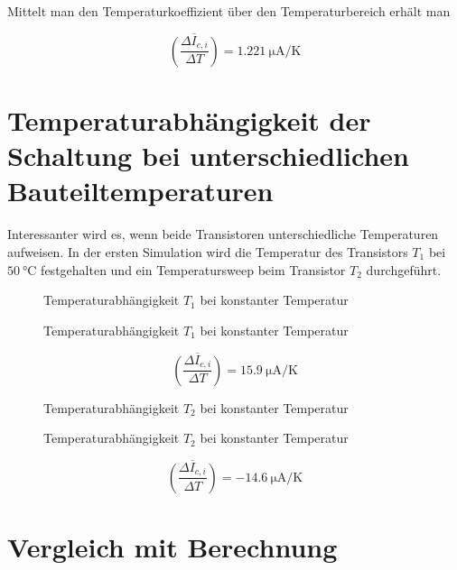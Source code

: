 Mittelt man den Temperaturkoeffizient über den Temperaturbereich erhält man

\begin{equation}
    \overline{\left({\frac{\Delta I_{c,i}}{\Delta T}}\right)} = \SI{1.221}{\micro\ampere\per\kelvin}
\end{equation}

\section{Temperaturabhängigkeit der Schaltung bei unterschiedlichen Bauteiltemperaturen}
Interessanter wird es, wenn beide Transistoren unterschiedliche Temperaturen aufweisen. In der ersten Simulation wird die Temperatur des Transistors $T_1$ bei $\SI{50}{\celsius}$ festgehalten und ein Temperatursweep beim Transistor $T_2$ durchgeführt.

\begin{figure}[H]
	\centering \small
	\scalebox{0.9}{}
	\caption{Temperaturabhängigkeit $T_1$ bei konstanter Temperatur}
	\label{fig_Kap4_08:diffT_1}
\end{figure}

\begin{figure}[H]
	\centering \small
	\scalebox{0.9}{}
	\caption{Temperaturabhängigkeit $T_1$ bei konstanter Temperatur}
	\label{fig_Kap4_09:diffT_2}
\end{figure}

\begin{equation}
    \overline{\left({\frac{\Delta I_{c,i}}{\Delta T}}\right)} = \SI{15.9}{\micro\ampere\per\kelvin}
\end{equation}

\begin{figure}[H]
	\centering \small
	\scalebox{0.9}{}
	\caption{Temperaturabhängigkeit $T_2$ bei konstanter Temperatur}
	\label{fig_Kap4_08:diffT_1}
\end{figure}

\begin{figure}[H]
	\centering \small
	\scalebox{0.9}{}
	\caption{Temperaturabhängigkeit $T_2$ bei konstanter Temperatur}
	\label{fig_Kap4_09:diffT_2}
\end{figure}

\begin{equation}
    \overline{\left({\frac{\Delta I_{c,i}}{\Delta T}}\right)} = \SI{-14.6}{\micro\ampere\per\kelvin}
\end{equation}

\section{Vergleich mit Berechnung}


